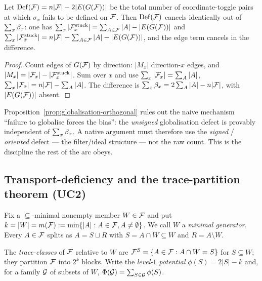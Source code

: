 \begin{proposition}
\label{prop:globalisation-orthogonal}
Let $\mathrm{Def}(\mathcal{F})=n|\mathcal{F}|-2|E(G(\mathcal{F}))|$ be the total number of
coordinate-toggle pairs at which $\sigma_x$ fails to be defined on
$\mathcal{F}$. Then $\mathrm{Def}(\mathcal{F})$ cancels identically out of $\sum_x
\beta_x$: one has
$\sum_x|\mathcal{F}^{\mathrm{stuck}}_x|=\sum_{A\in\mathcal{F}}|A|-|E(G(\mathcal{F}))|$ and
$\sum_x|\mathcal{F}^{\mathrm{stuck}}_{\bar x}|=n|\mathcal{F}|-\sum_{A\in\mathcal{F}}|A|-|E(G(\mathcal{F}))|$, and
the edge term cancels in the difference.
\end{proposition}

\begin{proof}
Count edges of $G(\mathcal{F})$ by direction: $|M_x|$ direction-$x$ edges, and
$|M_x|=|\mathcal{F}_x|-|\mathcal{F}^{\mathrm{stuck}}_x|$. Sum over $x$ and use
$\sum_x|\mathcal{F}_x|=\sum_A|A|$, $\sum_x|\mathcal{F}_{\bar x}|=n|\mathcal{F}|-\sum_A|A|$. The
difference is $\sum_x\beta_x=2\sum_A|A|-n|\mathcal{F}|$, with $|E(G(\mathcal{F}))|$
absent.
\end{proof}

Proposition~\ref{prop:globalisation-orthogonal} rules out the naive
mechanism ``failure to globalise forces the bias'': the \emph{unsigned}
globalisation defect is provably independent of $\sum_x\beta_x$. A
native argument must therefore use the \emph{signed} / \emph{oriented}
defect --- the filter/ideal structure --- not the raw count. This is
the discipline the rest of the arc obeys.

\subsection{Transport-deficiency and the trace-partition theorem (UC2)}
\label{ssec:uc2}

Fix a $\subseteq$-minimal nonempty member $W\in\mathcal{F}$ and put
$k=|W|=m(\mathcal{F}):=\min\{|A|:A\in\mathcal{F},A\neq\emptyset\}$. We call $W$ a
\emph{minimal generator}. Every $A\in\mathcal{F}$ splits as
$A=S\sqcup R$ with $S=A\cap W\subseteq W$ and $R=A\setminus W$.

\begin{definition}
\label{def:trace-class}
The \emph{trace-classes} of $\mathcal{F}$ relative to $W$ are
$\mathcal{F}^S=\{A\in\mathcal{F}:A\cap W=S\}$ for $S\subseteq W$; they partition $\mathcal{F}$
into $2^k$ blocks. Write the \emph{level-$1$ potential}
$\phi(S)=2|S|-k$ and, for a family $\mathcal{G}$ of subsets of $W$,
$\Phi(\mathcal{G})=\sum_{S\in\mathcal{G}}\phi(S)$.
\end{definition}

